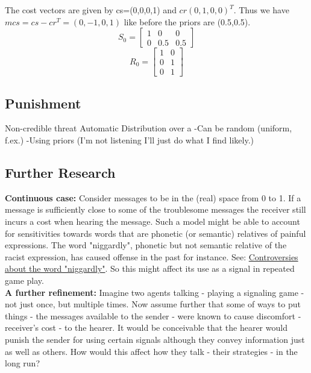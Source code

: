 \documentclass{article}
\begin{document}
The cost vectors are given by cs=(0,0,0,1) and $cr(0,1,0,0)^T$. Thus we have $mcs=cs - cr^T =(0,-1,0,1)$ like before the priors are (0.5,0.5).
\begin{equation*}
S_0=
\begin{bmatrix}
1 & 0 & 0\\
0 & 0.5 & 0.5
\end{bmatrix}
\end{equation*}
\begin{equation*}
R_0=
\begin{bmatrix}
1 & 0\\
0 & 1\\
0 & 1
\end{bmatrix}
\end{equation*}




\subsection{Punishment}
Non-credible threat
Automatic
Distribution over a
-Can be random (uniform, f.ex.)
-Using priors (I'm not listening I'll just do what I find likely.)

\subsection{Further Research}

\textbf{Continuous case:} Consider messages to be in the (real) space from 0 to 1. If a message is sufficiently close to some of the troublesome messages the receiver still incurs a cost when hearing the message.
Such a model might be able to account for sensitivities towards words that are phonetic (or semantic) relatives of painful expressions. The word "niggardly", phonetic but not semantic relative of the racist expression, has caused offense in the past for instance. See: \href{https://en.wikipedia.org/wiki/Controversies_about_the_word_\%22niggardly\%22}{Controversies about the word "niggardly"}. So this might affect its use as a signal in repeated game play.\\ 

\textbf{A further refinement:}
Imagine two agents talking - playing a signaling game - not just once, but multiple times. Now assume further that some of ways to put things - the messages available to the sender - were known to cause discomfort - receiver's cost - to the hearer. It would be conceivable that the hearer would punish the sender for using certain signals although they convey information just as well as others. How would this affect how they talk - their strategies - in the long run?\\ 
\end{document}
